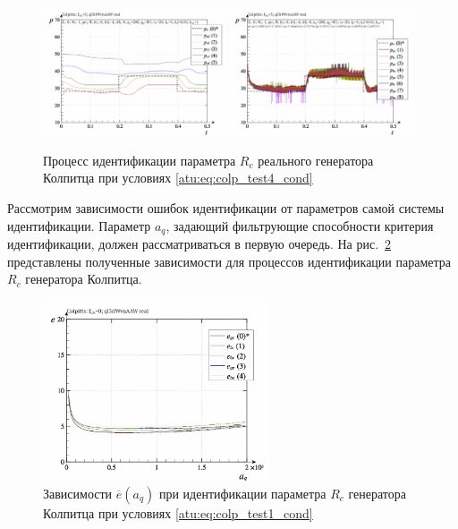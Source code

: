 \begin{figure}[htb!]
  \centerline{
    \includegraphics[width=0.48\textwidth]{p/r/colp_real_id-p_t_pi_ql3rlWvnAAW_real_d_3.png}
    \hfill
    \includegraphics[width=0.48\textwidth]{p/r/colp_real_id-p_t_p_ql3rlWvnAAW_real_d_3.png}
  }
  \caption{Процесс идентификации параметра $R_c$ реального генератора Колпитца при условиях \ref{atu:eq:colp_test4_cond} }
  \label{atu:f:colp_r_id_4}
\end{figure}



Рассмотрим зависимости ошибок идентификации от параметров самой системы идентификации.
Параметр $a_q$, задающий
фильтрующие способности критерия идентификации, должен рассматриваться в первую очередь.
На рис.~\ref{atu:f:colp_real_id_p_a_q_d_0} представлены полученные зависимости
для процессов идентификации параметра $R_c$ генератора Колпитца.

\begin{figure}[htb!]
  \centerline{\includegraphics[width=0.6\textwidth]{p/r/colp_real_id-p_a_q_d_0.png} }
  \caption{Зависимости $\overline{e}(a_q)$ при идентификации параметра $R_c$ генератора Колпитца при условиях \ref{atu:eq:colp_test1_cond} }
  \label{atu:f:colp_real_id_p_a_q_d_0}
\end{figure}


